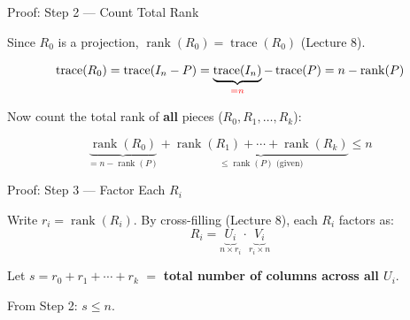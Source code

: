 \documentclass[10pt]{beamer}
\theoremstyle{definition}
\newcommand{\x}[1]{\alert{\textbf{#1}}}
\newcommand{\rd}[1]{{\color{red}#1}}                  %
\begin{document}
\begin{frame}{Proof: Step 2 --- Count Total Rank}

Since $R_0$ is a projection, $\operatorname{rank}(R_0) = \operatorname{trace}(R_0)$ (Lecture 8).

\vspace{0.3em}

$$\operatorname{trace}(R_0) = \operatorname{trace}(I_n - P) = \underbrace{\operatorname{trace}(I_n)}_{\rd{= n}} - \operatorname{trace}(P) = n - \operatorname{rank}(P)$$

\vspace{0.5em}

Now count the total rank of \x{all} pieces ($R_0, R_1, \ldots, R_k$):

\vspace{0.3em}

$$\underbrace{\operatorname{rank}(R_0)}_{= n - \operatorname{rank}(P)} + \underbrace{\operatorname{rank}(R_1) + \cdots + \operatorname{rank}(R_k)}_{\leq \operatorname{rank}(P) \text{ (given)}} \leq n$$

\end{frame}


\begin{frame}{Proof: Step 3 --- Factor Each $R_i$}

Write $r_i = \operatorname{rank}(R_i)$. By cross-filling (Lecture 8), each $R_i$ factors as:
$$R_i = \underbrace{U_i}_{n \times r_i} \cdot \underbrace{V_i}_{r_i \times n}$$

\vspace{0.3em}

Let $s = r_0 + r_1 + \cdots + r_k$ $=$ \x{total number of columns across all $U_i$}.

From Step 2: $s \leq n$.

\end{frame}
\end{document}

